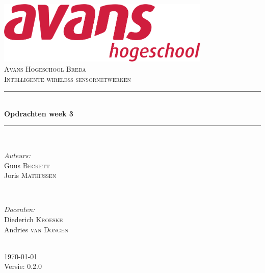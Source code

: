 \documentclass[12pt]{article}
\begin{document}
\begin{titlepage}
\newcommand{\HRule}{\rule{\linewidth}{0.5mm}} %

\center %

\includegraphics[height=3cm] {avans}\\%
\textsc{\Large Avans Hogeschool Breda}\\[0.5cm] %
\textsc{\large Intelligente wireless sensornetwerken }\\[0.5cm] %
\HRule \\[0.4cm]
{ \huge \bfseries Opdrachten week 3	}\\[0.4cm] %
\HRule \\[1.5cm]

\begin{minipage}{0.4\textwidth}
\begin{flushleft} \large
\emph{Auteurs:}\\
Guus \textsc{Beckett} \\%
Joris \textsc{Mathijssen}
\end{flushleft}
\end{minipage}
~
\begin{minipage}{0.4\textwidth}
\begin{flushright} \large
\emph{Docenten:} \\
Diederich \textsc{Kroeske} \\ %
Andries \textsc{van Dongen} \\ %
\end{flushright}
\end{minipage}\\[4cm]

{\large \today}\\[3cm] %

Versie: 0.2.0

\vfill %

\end{titlepage}
\end{document}
